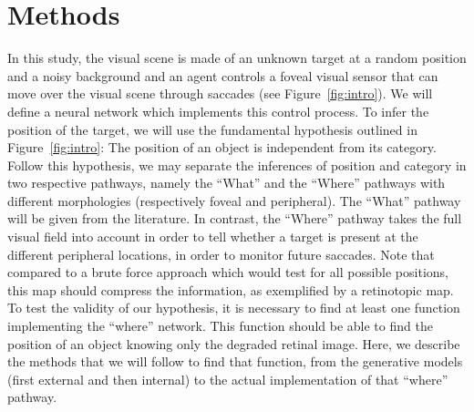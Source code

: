 \section{Methods}
\label{sec:methods}
In this study, the visual scene is made of an unknown target at a random position and a noisy background and an agent controls a foveal visual sensor that can move over the visual scene through saccades (see Figure~\ref{fig:intro}). We will define a neural network which implements this control process. To infer the position of the target, we will use the fundamental hypothesis outlined in Figure~\ref{fig:intro}: The position of an object is independent from its category. Follow this hypothesis, we may separate the inferences of position and category in two respective pathways, namely the ``What'' and the ``Where'' pathways with different morphologies (respectively foveal and peripheral). The ``What'' pathway will be given from the literature. In contrast, the ``Where'' pathway takes the full visual field into account in order to tell whether a target is present at the different peripheral locations, in order to monitor future saccades. Note that compared to a brute force approach which would test for all possible positions, this map should compress the information, as exemplified by a retinotopic map. To test the validity of our hypothesis, it is necessary to find at least one function implementing the ``where'' network. This function should be able to find the position of an object knowing only the degraded retinal image. Here, we describe the methods that we will follow to find that function, from the generative models (first external and then internal) to the actual implementation of that ``where'' pathway. %

